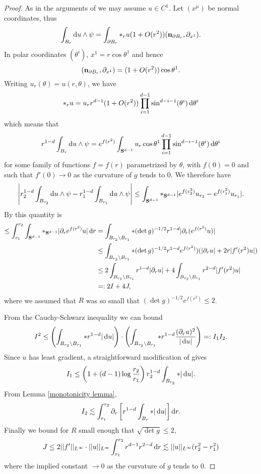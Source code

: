 \begin{proof}
As in the arguments of \cite[Chapter 5]{Giusti77} we may assume $u \in C^1$.
Let $(x^\mu)$ be normal coordinates, thus
$$\int_{B_r} \mathop{}\!\mathrm{d} u \wedge \psi = \int_{\partial B_r} *_r u(1 + O(r^2))(\mathbf n_{\partial B_r}, \partial_{x^1}).$$
In polar coordinates $(\theta^i)$, $x^1 = r \cos \theta^1$ and hence
$$(\mathbf n_{\partial B_r}, \partial_{x^1}) = (1 + O(r^2)) \cos \theta^1.$$
Writing $u_r(\theta) = u(r, \theta)$, we have
$$*_r u = u_r r^{d - 1}(1 + O(r^2)) \prod_{i=1}^{d - 1} \sin^{d - i - 1}(\theta^i) \mathop{}\!\mathrm{d} \theta^i$$
which means that 
$$r^{1 - d} \int_{B_r} \mathop{}\!\mathrm{d} u \wedge \psi = e^{f(r^2)} \int_{\mathbf S^{d - 1}} u_r \cos \theta^1 \prod_{i=1}^{d - 1} \sin^{d - i - 1}(\theta^i) \mathop{}\!\mathrm{d} \theta^i$$
for some family of functions $f = f(r)$ parametrized by $\theta$, with $f(0) = 0$ and such that $f'(0) \to 0$ as the curvature of $g$ tends to $0$.
We therefore have 
$$
\left|r_2^{1 - d} \int_{B_{r_2}} \mathop{}\!\mathrm{d} u \wedge \psi - r_1^{1 - d} \int_{B_{r_1}} \mathop{}\!\mathrm{d} u \wedge \psi \right| \leq \int_{\mathbf S^{d - 1}} *_{\mathbf S^{d - 1}} |e^{f(r_2^2)} u_{r_2} - e^{f(r_1^2)} u_{r_1}|.$$
By \cite[Lemma 5.3]{Giusti77} this quantity is 
\begin{align*}
\leq \int_{r_1}^{r_2} \int_{\mathbf S^{d - 1}} *_{\mathbf S^{d - 1}} |\partial_r e^{f(r^2)}u| \mathop{}\!\mathrm{d} r &= \int_{B_{r_2} \setminus B_{r_1}} *(\det g)^{-1/2}r^{1 - d}|\partial_r (e^{f(r^2)}u)|\\
&\leq \int_{B_{r_2} \setminus B_{r_1}} *(\det g)^{-1/2}r^{1 - d}e^{f(r^2)})(|\partial_ru| + 2r|f'(r^2)u|)\\
&\leq 2\int_{B_{r_2} \setminus B_{r_1}} r^{1 - d}|\partial_ru| + 4\int_{B_{r_2} \setminus B_{r_1}} r^{2-d} |f'(r^2)u|\\
&=: 2I + 4J,
\end{align*}
where we assumed that $R$ was so small that $(\det g)^{-1/2} e^{f(r^2)} \leq 2$.

From the Cauchy-Schwarz inequality we can bound 
$$I^2 \leq \left(\int_{B_{r_2} \setminus B_{r_1}} *r^{1 - d}|\mathop{}\!\mathrm{d} u|\right) \cdot \left(\int_{B_{r_2} \setminus B_{r_1}} *r^{1 - d} \frac{(\partial_r u)^2}{|\mathop{}\!\mathrm{d} u|}\right) =: I_1I_2.$$
Since $u$ has least gradient, a straightforward modification of \cite[Lemma 5.11]{Giusti77} gives 
$$I_1 \leq \left(1 + (d - 1) \log \frac{r_2}{r_1}\right) r_2^{1 - d} \int_{B_{r_2}} *|\mathop{}\!\mathrm{d} u|.$$
From Lemma \ref{monotonicity lemma},
$$I_2 \lesssim \int_{r_1}^{r_2} \partial_r \left[r^{1 - d}\int_{B_r} *|\mathop{}\!\mathrm{d} u|\right] \mathop{}\!\mathrm{d} r.$$
Finally we bound for $R$ small enough that $\sqrt{\det g} \leq 2$,
$$J \leq 2 ||f'||_{L^\infty} \cdot ||u||_{L^\infty} \int_{r_1}^{r_2} r^{d - 1}r^{2 - d} \mathop{}\!\mathrm{d} r \lesssim ||u||_{L^\infty} (r_2^2 - r_1^2)$$
where the implied constant $\to 0$ as the curvature of $g$ tends to $0$.
\end{proof}

